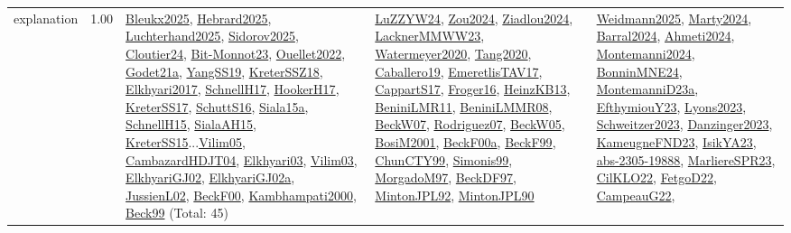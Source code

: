 {\begin{longtable}{p{3cm}r>{\raggedright\arraybackslash}p{6cm}>{\raggedright\arraybackslash}p{6cm}>{\raggedright\arraybackslash}p{8cm}}
\index{explanation}\index{Concepts!explanation}explanation &  1.00 & \hyperref[detail:Bleukx2025]{Bleukx2025}, \hyperref[detail:Hebrard2025]{Hebrard2025}, \hyperref[detail:Luchterhand2025]{Luchterhand2025}, \hyperref[detail:Sidorov2025]{Sidorov2025}, \hyperref[detail:Cloutier24]{Cloutier24}, \hyperref[detail:Bit-Monnot23]{Bit-Monnot23}, \hyperref[detail:Ouellet2022]{Ouellet2022}, \hyperref[detail:Godet21a]{Godet21a}, \hyperref[detail:YangSS19]{YangSS19}, \hyperref[detail:KreterSSZ18]{KreterSSZ18}, \hyperref[detail:Elkhyari2017]{Elkhyari2017}, \hyperref[detail:SchnellH17]{SchnellH17}, \hyperref[detail:HookerH17]{HookerH17}, \hyperref[detail:KreterSS17]{KreterSS17}, \hyperref[detail:SchuttS16]{SchuttS16}, \hyperref[detail:Siala15a]{Siala15a}, \hyperref[detail:SchnellH15]{SchnellH15}, \hyperref[detail:SialaAH15]{SialaAH15}, \hyperref[detail:KreterSS15]{KreterSS15}...\hyperref[detail:Vilim05]{Vilim05}, \hyperref[detail:CambazardHDJT04]{CambazardHDJT04}, \hyperref[detail:Elkhyari03]{Elkhyari03}, \hyperref[detail:Vilim03]{Vilim03}, \hyperref[detail:ElkhyariGJ02]{ElkhyariGJ02}, \hyperref[detail:ElkhyariGJ02a]{ElkhyariGJ02a}, \hyperref[detail:JussienL02]{JussienL02}, \hyperref[detail:BeckF00]{BeckF00}, \hyperref[detail:Kambhampati2000]{Kambhampati2000}, \hyperref[detail:Beck99]{Beck99} (Total: 45) & \hyperref[detail:LuZZYW24]{LuZZYW24}, \hyperref[detail:Zou2024]{Zou2024}, \hyperref[detail:Ziadlou2024]{Ziadlou2024}, \hyperref[detail:LacknerMMWW23]{LacknerMMWW23}, \hyperref[detail:Watermeyer2020]{Watermeyer2020}, \hyperref[detail:Tang2020]{Tang2020}, \hyperref[detail:Caballero19]{Caballero19}, \hyperref[detail:EmeretlisTAV17]{EmeretlisTAV17}, \hyperref[detail:CappartS17]{CappartS17}, \hyperref[detail:Froger16]{Froger16}, \hyperref[detail:HeinzKB13]{HeinzKB13}, \hyperref[detail:BeniniLMR11]{BeniniLMR11}, \hyperref[detail:BeniniLMMR08]{BeniniLMMR08}, \hyperref[detail:BeckW07]{BeckW07}, \hyperref[detail:Rodriguez07]{Rodriguez07}, \hyperref[detail:BeckW05]{BeckW05}, \hyperref[detail:BosiM2001]{BosiM2001}, \hyperref[detail:BeckF00a]{BeckF00a}, \hyperref[detail:BeckF99]{BeckF99}, \hyperref[detail:ChunCTY99]{ChunCTY99}, \hyperref[detail:Simonis99]{Simonis99}, \hyperref[detail:MorgadoM97]{MorgadoM97}, \hyperref[detail:BeckDF97]{BeckDF97}, \hyperref[detail:MintonJPL92]{MintonJPL92}, \hyperref[detail:MintonJPL90]{MintonJPL90} & \hyperref[detail:Weidmann2025]{Weidmann2025}, \hyperref[detail:Marty2024]{Marty2024}, \hyperref[detail:Barral2024]{Barral2024}, \hyperref[detail:Ahmeti2024]{Ahmeti2024}, \hyperref[detail:Montemanni2024]{Montemanni2024}, \hyperref[detail:BonninMNE24]{BonninMNE24}, \hyperref[detail:MontemanniD23a]{MontemanniD23a}, \hyperref[detail:EfthymiouY23]{EfthymiouY23}, \hyperref[detail:Lyons2023]{Lyons2023}, \hyperref[detail:Schweitzer2023]{Schweitzer2023}, \hyperref[detail:Danzinger2023]{Danzinger2023}, \hyperref[detail:KameugneFND23]{KameugneFND23}, \hyperref[detail:IsikYA23]{IsikYA23}, \hyperref[detail:abs-2305-19888]{abs-2305-19888}, \hyperref[detail:MarliereSPR23]{MarliereSPR23}, \hyperref[detail:CilKLO22]{CilKLO22}, \hyperref[detail:FetgoD22]{FetgoD22}, \hyperref[detail:CampeauG22]{CampeauG22}, 
\end{longtable}}
